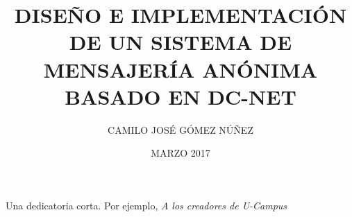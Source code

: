 \documentclass[upright, contnum]{umemoria}
\author{CAMILO JOSÉ GÓMEZ NÚÑEZ}
\title{DISEÑO E IMPLEMENTACIÓN DE UN SISTEMA DE MENSAJERÍA ANÓNIMA BASADO EN DC-NET}
\date{MARZO 2017}
\begin{document}
\frontmatter
\maketitle

\begin{abstract}
{\lipsum[1-4]}
\end{abstract}

\begin{dedicatoria} %
Una dedicatoria corta. Por ejemplo, \emph{A los creadores de U-Campus}
\end{dedicatoria}

\begin{thanks} %
\lipsum[1-2]
\end{thanks}
\cleardoublepage

\tableofcontents

\mainmatter













\end{document}

